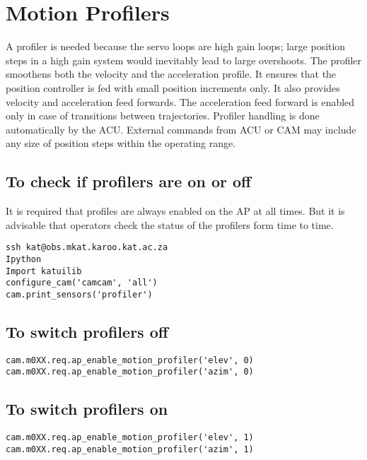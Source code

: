 
 \section{Motion Profilers}

A profiler is needed because the servo loops are high gain loops; large position steps in 
a high gain system would inevitably lead to large overshoots. The profiler smoothens both the velocity and the acceleration profile. It ensures that the position controller is fed with small position increments only. It also provides velocity and acceleration feed forwards. The acceleration feed forward is enabled only in case of transitions between trajectories. Profiler handling is done automatically by the ACU. External commands from ACU or CAM may include any size of position steps within the operating range.

\subsection{ To check if profilers are on or off}
It is required that profiles are always enabled on the AP at all times. But it is advisable that operators check the status of the profilers form time to time. 
\begin{lstlisting}[style=DOS]
ssh kat@obs.mkat.karoo.kat.ac.za
Ipython
Import katuilib
configure_cam('camcam', 'all')
cam.print_sensors('profiler')
\end{lstlisting}





\subsection{ To switch profilers off}
\begin{lstlisting}[style=DOS]
cam.m0XX.req.ap_enable_motion_profiler('elev', 0)
cam.m0XX.req.ap_enable_motion_profiler('azim', 0)
\end{lstlisting}




\subsection{To switch profilers on}
\begin{lstlisting}[style=DOS]
cam.m0XX.req.ap_enable_motion_profiler('elev', 1)
cam.m0XX.req.ap_enable_motion_profiler('azim', 1)

\end{lstlisting}



